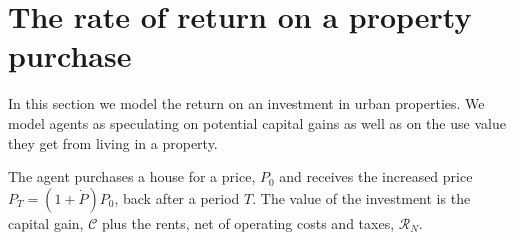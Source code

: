 


\section{The rate of return on a property purchase}

 
 In this section we model the return on an investment in urban properties. We model agents as %
 speculating on potential \glspl{capital gain} as well as on the \gls{use value} they get from living in a property. %

 The agent purchases a house for a price, $P_0$ %
 and receives the increased price $P_T = (1 + \dot P)P_0$, back after a period $T$. 
The value of the investment is the capital gain, $\mathcal{C}$ plus the rents, net of operating costs and taxes, $\mathcal{R}_N$.


